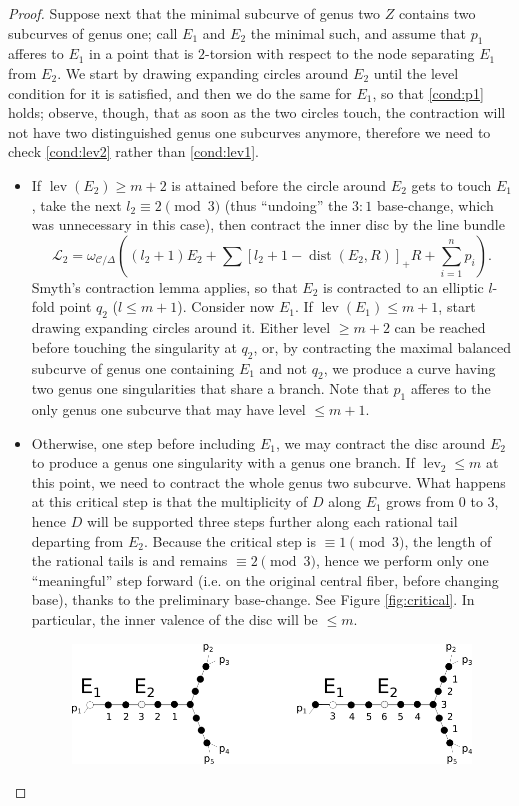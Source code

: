 \documentclass[11pt]{amsart}
\newcommand{\dvr}{\Delta}
\newcommand{\lev}{\operatorname{lev}}
\theoremstyle{plain}
\theoremstyle{definition}
\begin{document}
\begin{proof}
  Suppose next that the minimal subcurve of genus two $Z$ contains two subcurves of genus one; call $E_1$ and $E_2$ the minimal such, and assume that $p_1$ afferes to $E_1$ in a point that is $2$-torsion with respect to the node separating $E_1$ from $E_2$. We start by drawing expanding circles around $E_2$ until the level condition for it is satisfied, and then we do the same for $E_1$, so that \eqref{cond:p1} holds; observe, though, that as soon as the two circles touch, the contraction will not have two distinguished genus one subcurves anymore, therefore we need to check \eqref{cond:lev2} rather than \eqref{cond:lev1}.
  \begin{itemize}[leftmargin=.4cm]
  \item If $\lev(E_2)\geq m+2$ is attained before the circle around $E_2$ gets to touch $E_1$, take the next $l_2\equiv 2  \pmod 3$ (thus ``undoing'' the $3:1$ base-change, which was unnecessary in this case), then contract the inner disc by the line bundle \[\mathcal L_2=\omega_{\mathcal C/\dvr}((l_2+1)E_2+\sum [l_2+1-\operatorname{dist}(E_2,R)]_+R+\sum_{i=1}^n p_i).\] Smyth's contraction lemma \cite[Lemma 2.13]{SMY1} applies, so that $E_2$ is contracted to an elliptic $l$-fold point $q_2$ ($l\leq m+1$). Consider now $E_1$. If $\lev(E_1)\leq m+1$, start drawing expanding circles around it. Either level $\geq m+2$ can be reached before touching the singularity at $q_2$, or, by contracting the maximal balanced subcurve of genus one containing $E_1$ and not $q_2$, we produce a curve having two genus one singularities that share a branch. Note that $p_1$ afferes to the only genus one subcurve that may have level $\leq m+1$.
  \item Otherwise, one step before including $E_1$, we may contract the disc around $E_2$ to produce a genus one singularity with a genus one branch. If $\lev_2\leq m$ at this point, we need to contract the whole genus two subcurve. What happens at this critical step is that the multiplicity of $D$ along $E_1$ grows from $0$ to $3$, hence $D$ will be supported three steps further along each rational tail departing from $E_2$. Because the critical step is $\equiv 1\pmod 3$, the length of the rational tails is and remains $\equiv 2 \pmod 3$, hence we perform only one ``meaningful'' step forward (i.e. on the original central fiber, before changing base), thanks to the preliminary base-change. See Figure \ref{fig:critical}. In particular, the inner valence of the disc will be $\leq m$.
  \begin{figure}
   \includegraphics[width=.8\textwidth]{critical_step}

\end{figure}
\end{itemize}
\end{proof}
\end{document}
